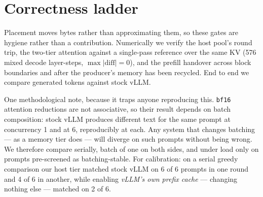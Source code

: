 
\section{Correctness ladder}
\label{app:correct}

Placement moves bytes rather than approximating them, so these gates are
hygiene rather than a contribution. Numerically we verify the host pool's round
trip, the two-tier attention against a single-pass reference over the same KV
(576 mixed decode layer-steps, $\max|\mathrm{diff}| = 0$), and the prefill
handover across block boundaries and after the producer's memory has been
recycled. End to end we compare generated tokens against stock vLLM.

One methodological note, because it traps anyone reproducing this.
\texttt{bf16} attention reductions are not associative, so their result depends
on batch composition: stock vLLM produces different text for the same prompt at
concurrency 1 and at 6, reproducibly at each. Any system that changes batching
--- as a memory tier does --- will diverge on such prompts without being wrong.
We therefore compare serially, batch of one on both sides, and under load only
on prompts pre-screened as batching-stable. For calibration: on a serial greedy
comparison our host tier matched stock vLLM on 6 of 6 prompts in one round and
4 of 6 in another, while enabling \emph{vLLM's own prefix cache} --- changing
nothing else --- matched on 2 of 6.
